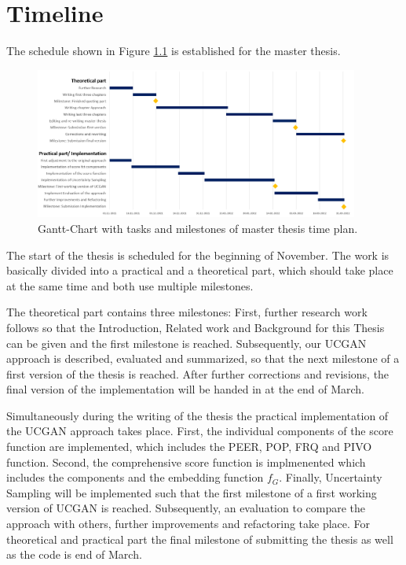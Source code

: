 \chapter{Timeline}
\label{ch:timeline}

The schedule shown in Figure \ref{fig:timeline} is established for the master thesis.
\begin{figure}
  \centering
    \includegraphics[width=0.95\textwidth]{figures/gantt_chart.png}
  \caption{Gantt-Chart with tasks and milestones of master thesis time plan.}
  \label{fig:timeline}
\end{figure}
The start of the thesis is scheduled for the beginning of November.
The work is basically divided into a practical and a theoretical part, which should take place at the same time and both use multiple milestones.

The theoretical part contains three milestones:
First, further research work follows so that the Introduction, Related work and Background for this Thesis can be given and the first milestone is reached.
Subsequently, our \ac{UCGAN} approach is described, evaluated and summarized, so that the next milestone of a first version of the thesis is reached.
After further corrections and revisions, the final version of the implementation will be handed in at the end of March.

Simultaneously during the writing of the thesis the practical implementation of the \ac{UCGAN} approach takes place.
First, the individual components of the score function are implemented, which includes the \ac{PEER}, \ac{POP}, \ac{FRQ} and \ac{PIVO} function.
Second, the comprehensive score function is implmenented which includes the components and the embedding function $f_G$.
Finally, Uncertainty Sampling will be implemented such that the first milestone of a first working version of \ac{UCGAN} is reached.
Subsequently, an evaluation to compare the approach with others, further improvements and refactoring take place.
For theoretical and practical part the final milestone of submitting the thesis as well as the code is end of March.
